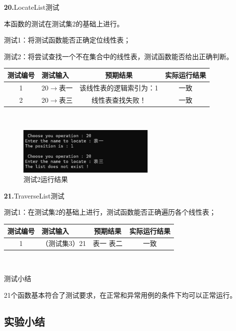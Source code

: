 \documentclass[supercite]{Experimental_Report}
\theoremstyle{definition}
\begin{document}
\noindent\textbf{20.}LocateList测试
	
本函数的测试在测试集2的基础上进行。

测试1：将测试函数能否正确定位线性表；

测试2：将尝试查找一个不在集合中的线性表，测试函数能否给出正确判断。

\vspace{0.5em}

\begin{tabular}{|c|p{2.7cm}|c|c|}
	\hline
	测试编号 & 测试输入 & 预期结果 & 实际运行结果 \\
	\hline
	1 & 20$\rightarrow$表一 & 该线性表的逻辑索引为：1 & 一致 \\
	\hline
	2 & 20$\rightarrow$表三 & 线性表查找失败！ & 一致 \\
	\hline
\end{tabular}

~\

 \begin{figure}[H]
 	\centering
 	\includegraphics[width=0.6\textwidth]{images/线性表测试20.png}
 	\caption{测试2运行结果}
 	\label{txlab}
 \end{figure}


\noindent\textbf{21.}TraverseList测试
	
测试1：在测试集2的基础上进行，测试函数能否正确遍历各个线性表；

\vspace{0.5em}

\begin{tabular}{|c|p{2.7cm}|c|c|}
	\hline
	测试编号 & 测试输入 & 预期结果 & 实际运行结果 \\
	\hline
	1 & （测试集3）21 & 表一 表二 & 一致 \\
	\hline
\end{tabular}

~\

测试小结

21个函数基本符合了测试要求，在正常和异常用例的条件下均可以正常运行。

\subsection{实验小结}
\end{document}
